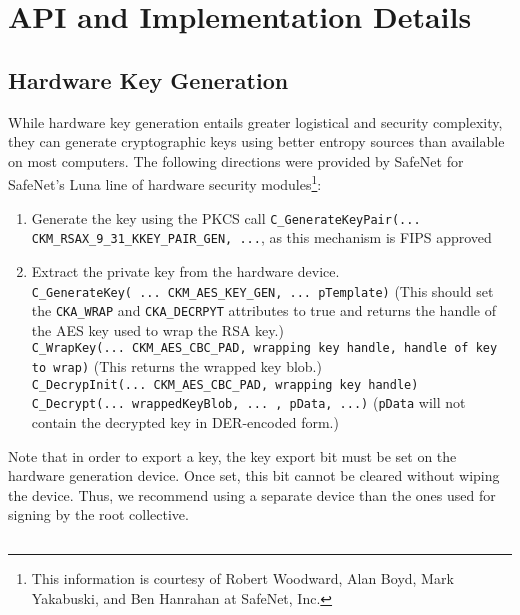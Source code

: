 \section{API and Implementation Details}

 \subsection{Hardware Key Generation}
\label{sec:hardgen}

While hardware key generation entails greater logistical and security complexity, they can generate cryptographic keys using better entropy sources than available on most computers. The following directions were provided by SafeNet for SafeNet's Luna line of hardware security modules\footnote{This information is courtesy of Robert
Woodward, Alan Boyd, Mark Yakabuski, and Ben Hanrahan at SafeNet,
Inc.}:
\begin{enumerate}
\item Generate the key using the PKCS call {\tt C\_GenerateKeyPair(... CKM\_RSAX\_9\_31\_KKEY\_PAIR\_GEN, ...}, as this mechanism is FIPS approved
\item Extract the private key from the hardware device. \\
	{\tt C\_GenerateKey( ... CKM\_AES\_KEY\_GEN, ... pTemplate)} (This should set the {\tt CKA\_WRAP} and {\tt CKA\_DECRPYT} attributes to true and returns the handle of the AES key used to wrap the RSA key.) \\
	{\tt C\_WrapKey(... CKM\_AES\_CBC\_PAD, wrapping key handle, handle of key to wrap)} (This returns  the wrapped key blob.) \\
	{\tt C\_DecrypInit(... CKM\_AES\_CBC\_PAD, wrapping key handle)} \\
	{\tt C\_Decrypt(... wrappedKeyBlob, ... , pData, ...)} ({\tt pData} will not contain the decrypted key in DER-encoded form.)
\end{enumerate}
Note that in order to export a key, the key export bit must be set on the hardware generation device. Once set, this bit cannot be cleared without wiping the device. Thus, we recommend using a separate device than the ones used for signing by the root collective.

\subsection{}
\label{sec:use-box-detail}

